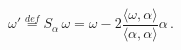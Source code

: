\begin{equation}
\label{weylgen}
\omega' \stackrel{def}{=} S_\alpha\, \omega = \omega
-2\frac{\langle\omega,\alpha\rangle}{\langle\alpha,\alpha
\rangle}\alpha\, .
\end{equation} 

